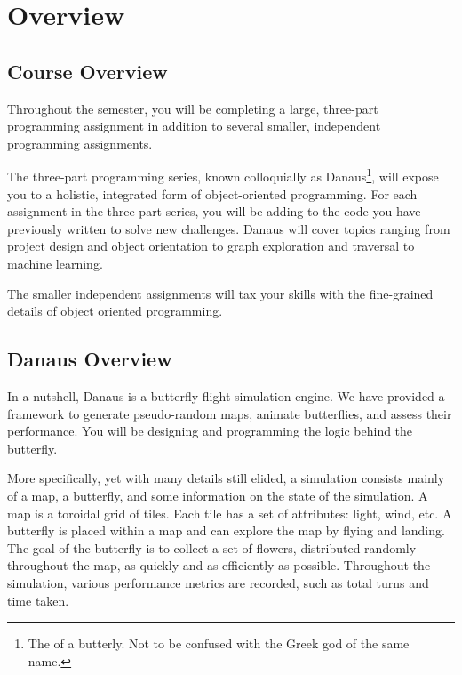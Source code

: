 \documentclass{pset}
\begin{document}
\ifx \TOC \undefined \else
\newpage
\tableofcontents
\newpage
\fi

\ifx \OVERVIEW \undefined \else
\section{Overview}
\ifx \COURSEOVERVIEW \undefined \else
\subsection{Course Overview}
Throughout the semester, you will be completing a large, three-part
programming assignment in addition to several smaller, independent programming
assignments.

The three-part programming series, known colloquially as Danaus\footnote{The
 of a butterly.  Not
to be confused with the Greek god of the same name.}, will expose you to a
holistic, integrated form of object-oriented programming. For each assignment
in the three part series, you will be adding to the code you have previously
written to solve new challenges. Danaus will cover topics ranging from project
design and object orientation to graph exploration and traversal to machine
learning.

The smaller independent assignments will tax your skills with the fine-grained
details of object oriented programming.
\fi

\ifx \DANAUSOVERVIEW \undefined \else
\subsection{Danaus Overview}
In a nutshell, Danaus is a butterfly flight simulation engine. We have provided
a framework to generate pseudo-random maps, animate butterflies, and assess
their performance. You will be designing and programming the logic behind the
butterfly.

More specifically, yet with many details still elided, a simulation consists
mainly of a map, a butterfly, and some information on the state of the
simulation. A map is a toroidal grid of tiles. Each tile has a set of
attributes: light, wind, etc. A butterfly is placed within a map and can
explore the map by flying and landing. The goal of the butterfly is to collect
a set of flowers, distributed randomly throughout the map, as quickly and as
efficiently as possible. Throughout the simulation, various performance metrics
are recorded, such as total turns and time taken.
\end{document}
